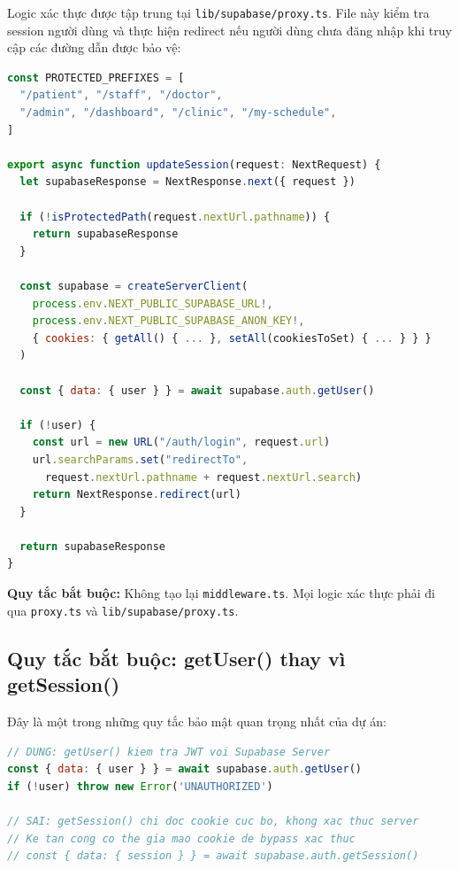 \documentclass[14pt,a4paper]{report}
\begin{document}
Logic xác thực được tập trung tại \texttt{lib/supabase/proxy.ts}.
File này kiểm tra session người dùng và thực hiện redirect nếu
người dùng chưa đăng nhập khi truy cập các đường dẫn được bảo vệ:

\begin{lstlisting}[language=JavaScript, caption={lib/supabase/proxy.ts -- Logic xác thực tập trung}]
const PROTECTED_PREFIXES = [
  "/patient", "/staff", "/doctor",
  "/admin", "/dashboard", "/clinic", "/my-schedule",
]

export async function updateSession(request: NextRequest) {
  let supabaseResponse = NextResponse.next({ request })

  if (!isProtectedPath(request.nextUrl.pathname)) {
    return supabaseResponse
  }

  const supabase = createServerClient(
    process.env.NEXT_PUBLIC_SUPABASE_URL!,
    process.env.NEXT_PUBLIC_SUPABASE_ANON_KEY!,
    { cookies: { getAll() { ... }, setAll(cookiesToSet) { ... } } }
  )

  const { data: { user } } = await supabase.auth.getUser()

  if (!user) {
    const url = new URL("/auth/login", request.url)
    url.searchParams.set("redirectTo",
      request.nextUrl.pathname + request.nextUrl.search)
    return NextResponse.redirect(url)
  }

  return supabaseResponse
}
\end{lstlisting}

\textbf{Quy tắc bắt buộc:} Không tạo lại \texttt{middleware.ts}.
Mọi logic xác thực phải đi qua \texttt{proxy.ts} và
\texttt{lib/supabase/proxy.ts}.

\subsection{Quy tắc bắt buộc: getUser() thay vì getSession()}

Đây là một trong những quy tắc bảo mật quan trọng nhất của dự án:

\begin{lstlisting}[language=JavaScript, caption={So sánh getUser() vs getSession()}]
// DUNG: getUser() kiem tra JWT voi Supabase Server
const { data: { user } } = await supabase.auth.getUser()
if (!user) throw new Error('UNAUTHORIZED')

// SAI: getSession() chi doc cookie cuc bo, khong xac thuc server
// Ke tan cong co the gia mao cookie de bypass xac thuc
// const { data: { session } } = await supabase.auth.getSession()
\end{lstlisting}
\end{document}
